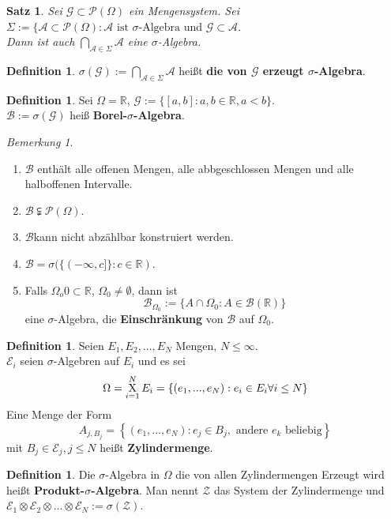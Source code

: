 \documentclass[10pt,a4paper]{article}
\newcommand{\R}{\ensuremath{\mathbb{R}}}
\newcommand{\potset}{\mathscr P}
\newcounter{thm}[section]
\theoremstyle{definition}
\newtheorem{definition}[thm]{Definition}
\theoremstyle{plain}
\newtheorem{satz}[thm]{Satz}
\theoremstyle{remark}
\newtheorem{bem}[thm]{Bemerkung}
\begin{document}
	\begin{satz}
		Sei $\mathscr G\subset\potset(\Omega)$ ein Mengensystem. Sei $\Sigma:=\{\mathscr A\subset \potset(\Omega):\text{$\mathscr A$ ist $\sigma$-Algebra und $\mathscr G\subset\mathscr A$}$.\\
		Dann ist auch $\bigcap_{\mathscr A\in\Sigma}\mathscr A$ eine $\sigma$-Algebra.
	\end{satz}
	\addtocounter{thm}{-1}
	\begin{definition}
		$\sigma(\mathscr G):= \bigcap_{\mathscr A\in\Sigma}\mathscr A$ heißt \textbf{die von $\mathscr G$ erzeugt $\sigma$-Algebra}.
	\end{definition}

	\begin{definition}
		Sei $\Omega=\R$, $\mathscr G:=\{[a,b]:a,b\in\R,a<b\}$.\\
		$\mathscr B:=\sigma(\mathscr G)$ heiß \textbf{Borel-$\sigma$-Algebra}.
	\end{definition}

	\begin{bem}
		\begin{enumerate}
			\item $\mathscr B$ enthält alle offenen Mengen, alle abbgeschlossen Mengen und alle halboffenen Intervalle.
			\item $\mathscr B\subsetneqq \potset (\Omega)$.
			\item $\mathscr B$kann nicht abzählbar konstruiert werden.
			\item $\mathscr B=\sigma(\{(-\infty,c]\}:c\in\R)$.
			\item Falls $\Omega_o
			0\subset\R$, $\Omega_0\neq \emptyset$, dann ist
			\[\mathscr B_{\Omega_0}:=\{ A\cap\Omega_0:A\in \mathscr B(\R)\}\]
		eine $\sigma$-Algebra, die \textbf{Einschränkung} von $\mathscr B$ auf $\Omega_0$.
		\end{enumerate}
	\end{bem}

	\begin{definition}
		Seien $E_1,E_2,...,E_N$ Mengen, $N\leq \infty$.\\
		$\mathscr E_i$ seien $\sigma$-Algebren auf $E_i$ und es sei
		\[\Omega=\operatornamewithlimits{X}_{i=1}^NE_i=\left\{(e_1,...,e_N):e_i\in E_i\forall i\leq N\right\}\]
		Eine Menge der Form
		\[A_{j,B_j}=\left\{(e_1,...,e_N):e_j\in B_j,\text{ andere $e_k$ beliebig}\right\}\]
		mit $B_j\in\mathscr E_j,j\leq N$ heißt \textbf{Zylindermenge}.\\
	\end{definition}
	\addtocounter{thm}{-1}
	\begin{definition}
		Die $\sigma$-Algebra in $\Omega$ die von allen Zylindermengen Erzeugt wird heißt \textbf{Produkt-$\sigma$-Algebra}.
		Man nennt $\mathscr Z$ das System der Zylindermenge und $\mathscr E_1\otimes\mathscr E_2\otimes...\otimes \mathscr E_N:=\sigma(\mathscr Z)$.
	\end{definition}
\end{document}
